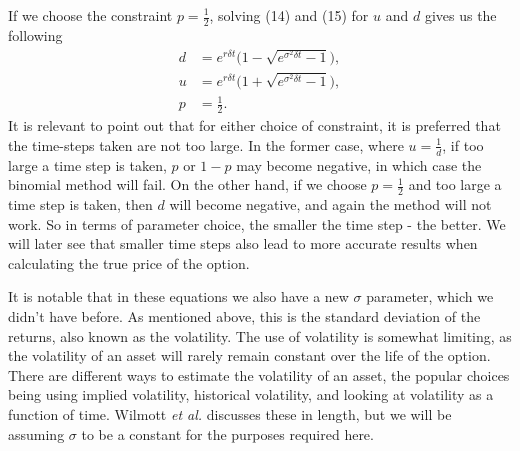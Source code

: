 \documentclass[letterpaper,12pt]{article}
\theoremstyle{plain}
\numberwithin{equation}{section}
\begin{document}
If we choose the constraint $p = \frac{1}{2}$, solving (14) and (15) for $u$ and $d$ gives us the following
\begin{equation}
	\begin{aligned}
	d & = e^{r\delta t}\big(1 -\sqrt{e^{\sigma^2\delta t}-1} \big),\\
	u & = e^{r\delta t}\big(1 +\sqrt{e^{\sigma^2\delta t}-1} \big),\\
	p &= \frac{1}{2}.
	\end{aligned}
\end{equation}
It is relevant to point out that for either choice of constraint, it is preferred that the time-steps taken are not too large. In the former case, where $u = \frac{1}{d} $, if too large a time step is taken, $p$ or $1-p$ may become negative, in which case the binomial method will fail. On the other hand, if we choose $p = \frac{1}{2} $ and too large a time step is taken, then $d$ will become negative, and again the method will not work. So in terms of parameter choice, the smaller the time step - the better. We will later see that smaller time steps also lead to more accurate results when calculating the true price of the option.

It is notable that in these equations we also have a new $\sigma$ parameter, which we didn't have before. As mentioned above, this is the standard deviation of the returns, also known as the volatility. The use of volatility is somewhat limiting, as the volatility of an asset will rarely remain constant over the life of the option. There are different ways to estimate the volatility of an asset, the popular choices being using implied volatility, historical volatility, and looking at volatility as a function of time. Wilmott {\em et al.} discusses these in length, but we will be assuming $\sigma$ to be a constant for the purposes required here.
\end{document}
